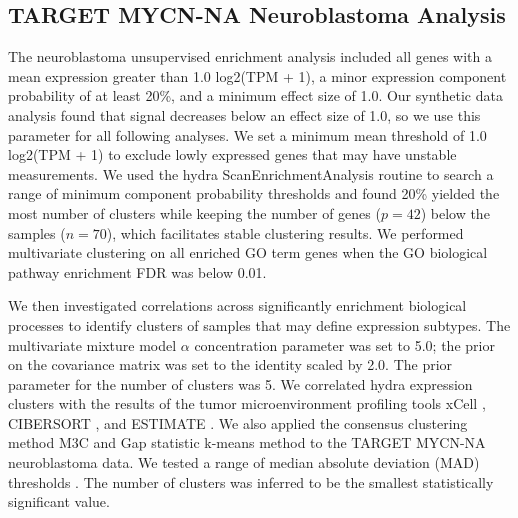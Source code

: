 \documentclass[10pt,letterpaper]{article}
\begin{document}
\subsection{TARGET MYCN-NA Neuroblastoma Analysis}
The neuroblastoma unsupervised enrichment analysis included all genes with a mean expression greater than 1.0 log2(TPM + 1), a minor expression component probability of at least 20\%, and a minimum effect size of 1.0. Our synthetic data analysis found that signal decreases below an effect size of 1.0, so we use this parameter for all following analyses. We set a minimum mean threshold of 1.0 log2(TPM + 1) to exclude lowly expressed genes that may have unstable measurements. We used the hydra ScanEnrichmentAnalysis routine to search a range of minimum component probability thresholds and found 20\% yielded the most number of clusters while keeping the number of genes ($p=42$) below the samples ($n=70$), which facilitates stable clustering results. We performed multivariate clustering on all enriched GO term genes when the GO biological pathway enrichment FDR was below 0.01.

We then investigated correlations across significantly enrichment biological processes to identify clusters of samples that may define expression subtypes. The multivariate mixture model $\alpha$ concentration parameter was set to 5.0; the prior on the covariance matrix was set to the identity scaled by 2.0. The prior parameter for the number of clusters was 5. We correlated hydra expression clusters with the results of the tumor microenvironment profiling tools xCell \cite{aranXCellDigitallyPortraying2017}, CIBERSORT \cite{newmanRobustEnumerationCell2015}, and ESTIMATE \cite{yoshiharaInferringTumourPurity2013}. We also applied the consensus clustering method M3C \cite{johnM3CMonteCarlo2018} and Gap statistic k-means method \cite{tibshirani2001estimating} to the TARGET MYCN-NA neuroblastoma data. We tested a range of median absolute deviation (MAD) thresholds . The number of clusters was inferred to be the smallest statistically significant value.
\end{document}
